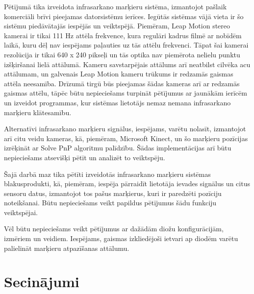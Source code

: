 \documentclass[12pt, a4paper, oneside, openright]{article}
\begin{document}
\par
Pētījumā tika izveidota infrasarkano marķieru sistēma, izmantojot pašlaik komerciāli brīvi
pieejamas datorsistēmu ierīces. Iegūtās sistēmas vājā vieta ir šo sistēmu piedāvātajās
iespējās un veiktspējā. Piemēram, Leap Motion stereo kamerai ir tikai 111 Hz attēla frekvence,
kura regulāri kadrus filmē ar nobīdēm laikā, kuru dēļ nav iespējams paļauties uz tās 
attēlu frekvenci. Tāpat šai kamerai rezolūcija ir tikai 640 x 240 pikseļi un tās optika
nav piemērota nelielu punktu izšķiršanai lielā attālumā. Kameru savstarpējais attālums arī
neatbilst cilvēka acu attālumam, un galvenais Leap Motion kameru trūkums ir redzamās gaismas
attēla neesamība. Drīzumā tirgū būs pieejamas šādas kameras arī ar redzamās gaismas attēlu,
tāpēc būtu nepieciešams turpināt pētījumus ar jaunākām ierīcēm un izveidot programmas,
kur sistēmas lietotājs nemaz nemana infrasarkano marķieru klātesamību.
\par
Alternatīvi infrasarkano marķieru signālus, iespējams, varētu nolasīt, izmantojot arī 
citu veidu kameras, kā, piemēram, Microsoft Kinect, un šo marķieru pozīcijas izrēķināt
ar Solve PnP algoritmu palīdzību. Šādas implementācijas arī būtu nepieciešams atsevišķi
pētīt un analizēt to veiktspēju.
\par
Šajā darbā maz tika pētīti izveidotās infrasarkano marķieru sistēmas blakusprodukti, kā, 
piemēram, iespēja pārraidīt lietotāja ievades signālus un citus sensoru datus,
izmantojot tos pašus marķierus, kuri ir paredzēti pozīciju noteikšanai. Būtu nepieciešams
veikt papildus pētījumus šādu funkciju veiktspējai.
\par
Vēl būtu nepieciešams veikt pētījumus ar dažādām diožu konfigurācijām, izmēriem un veidiem.
Iespējams, gaismas izkliedējoši ietvari ap diodēm varētu palielināt marķieru atpazīšanas
attālumu.



\newpage
\section{Secinājumi}\label{secinajumi}
\end{document}
